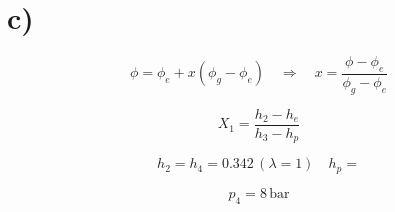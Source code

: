 

\section*{c)}

\[
\phi = \phi_e + x (\phi_g - \phi_e) \quad \Rightarrow \quad x = \frac{\phi - \phi_e}{\phi_g - \phi_e}
\]

\[
X_1 = \frac{h_2 - h_e}{h_3 - h_p}
\]

\[
h_2 = h_4 = 0.342 \, (\lambda = 1) \quad h_p = 
\]

\[
p_4 = 8 \, \text{bar}
\]